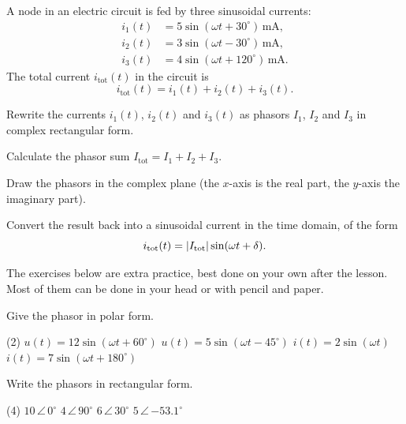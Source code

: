 
A node in an electric circuit is fed by three sinusoidal currents:
\begin{align*}
  i_1(t) &= 5\sin(\omega t + 30^{\circ})\,\text{mA}, \\
  i_2(t) &= 3\sin(\omega t - 30^{\circ})\,\text{mA}, \\
  i_3(t) &= 4\sin(\omega t + 120^{\circ})\,\text{mA}.
\end{align*}
The total current $i_{\text{tot}}(t)$ in the circuit is
\[
  i_{\text{tot}}(t) = i_1(t) + i_2(t) + i_3(t).
\]
\begin{parts}
  \item Rewrite the currents $i_1(t)$, $i_2(t)$ and $i_3(t)$ as phasors $I_1$, $I_2$ and $I_3$ in
    complex rectangular form.
  \item Calculate the phasor sum $I_{\text{tot}} = I_1 + I_2 + I_3$.
  \item Draw the phasors in the complex plane (the $x$-axis is the real part, the $y$-axis the
    imaginary part).
  \item Convert the result back into a sinusoidal current in the time domain, of the form
    \[
      i_{\text{tot}}(t) = \lvert I_{\text{tot}}\rvert\sin(\omega t + \delta).
    \]
\end{parts}

The exercises below are extra practice, best done on your own after the lesson. Most of them can
be done in your head or with pencil and paper.

Give the phasor in polar form.
\begin{delar}(2)
  \task $u(t) = 12\sin(\omega t + 60^{\circ})$
  \task $u(t) = 5\sin(\omega t - 45^{\circ})$
  \task $i(t) = 2\sin(\omega t)$
  \task $i(t) = 7\sin(\omega t + 180^{\circ})$
\end{delar}

Write the phasors in rectangular form.
\begin{delar}(4)
  \task $10\,\angle\,0^{\circ}$
  \task $4\,\angle\,90^{\circ}$
  \task $6\,\angle\,30^{\circ}$
  \task $5\,\angle\,{-53.1^{\circ}}$
\end{delar}

